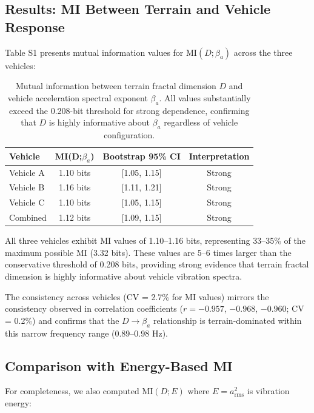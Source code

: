 \documentclass[11pt]{article}
\begin{document}
\subsection{Results: MI Between Terrain and Vehicle Response}

Table S1 presents mutual information values for $\text{MI}(D;\beta_a)$ across the three vehicles:

\begin{table}[h]
\centering
\begin{tabular}{lccc}
\hline
\textbf{Vehicle} & \textbf{MI(D;$\beta_a$)} & \textbf{Bootstrap 95\% CI} & \textbf{Interpretation} \\
\hline
Vehicle A & 1.10 bits & [1.05, 1.15] & Strong \\
Vehicle B & 1.16 bits & [1.11, 1.21] & Strong \\
Vehicle C & 1.10 bits & [1.05, 1.15] & Strong \\
\hline
Combined & 1.12 bits & [1.09, 1.15] & Strong \\
\hline
\end{tabular}
\caption{Mutual information between terrain fractal dimension $D$ and vehicle acceleration spectral exponent $\beta_a$. All values substantially exceed the 0.208-bit threshold for strong dependence, confirming that $D$ is highly informative about $\beta_a$ regardless of vehicle configuration.}
\end{table}

All three vehicles exhibit MI values of 1.10--1.16 bits, representing 33--35\% of the maximum possible MI (3.32 bits). These values are 5--6 times larger than the conservative threshold of 0.208 bits, providing strong evidence that terrain fractal dimension is highly informative about vehicle vibration spectra.

The consistency across vehicles (CV = 2.7\% for MI values) mirrors the consistency observed in correlation coefficients ($r = -0.957$, $-0.968$, $-0.960$; CV = 0.2\%) and confirms that the $D \rightarrow \beta_a$ relationship is terrain-dominated within this narrow frequency range (0.89--0.98 Hz).

\subsection{Comparison with Energy-Based MI}

For completeness, we also computed $\text{MI}(D;E)$ where $E = a_{\text{rms}}^2$ is vibration energy:
\end{document}
